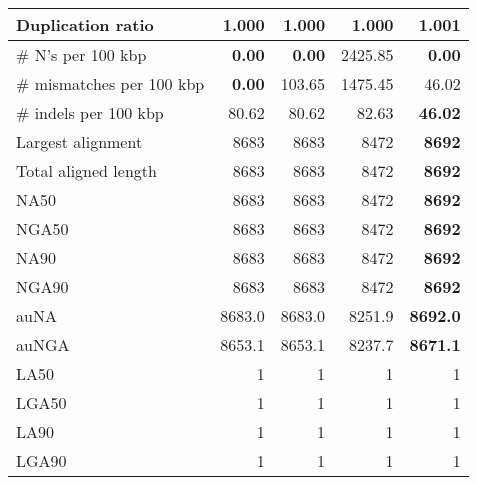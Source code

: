 \documentclass[12pt,a4paper]{article}
\begin{document}
\begin{table}[ht]
\begin{center}
\begin{tabular}{|l*{4}{|r}|}
Duplication ratio & {\bf 1.000} & {\bf 1.000} & {\bf 1.000} & 1.001 \\ \hline
\# N's per 100 kbp & {\bf 0.00} & {\bf 0.00} & 2425.85 & {\bf 0.00} \\ \hline
\# mismatches per 100 kbp & {\bf 0.00} & 103.65 & 1475.45 & 46.02 \\ \hline
\# indels per 100 kbp & 80.62 & 80.62 & 82.63 & {\bf 46.02} \\ \hline
Largest alignment & 8683 & 8683 & 8472 & {\bf 8692} \\ \hline
Total aligned length & 8683 & 8683 & 8472 & {\bf 8692} \\ \hline
NA50 & 8683 & 8683 & 8472 & {\bf 8692} \\ \hline
NGA50 & 8683 & 8683 & 8472 & {\bf 8692} \\ \hline
NA90 & 8683 & 8683 & 8472 & {\bf 8692} \\ \hline
NGA90 & 8683 & 8683 & 8472 & {\bf 8692} \\ \hline
auNA & 8683.0 & 8683.0 & 8251.9 & {\bf 8692.0} \\ \hline
auNGA & 8653.1 & 8653.1 & 8237.7 & {\bf 8671.1} \\ \hline
LA50 & 1 & 1 & 1 & 1 \\ \hline
LGA50 & 1 & 1 & 1 & 1 \\ \hline
LA90 & 1 & 1 & 1 & 1 \\ \hline
LGA90 & 1 & 1 & 1 & 1 \\ \hline
\end{tabular}
\end{center}
\end{table}
\end{document}

